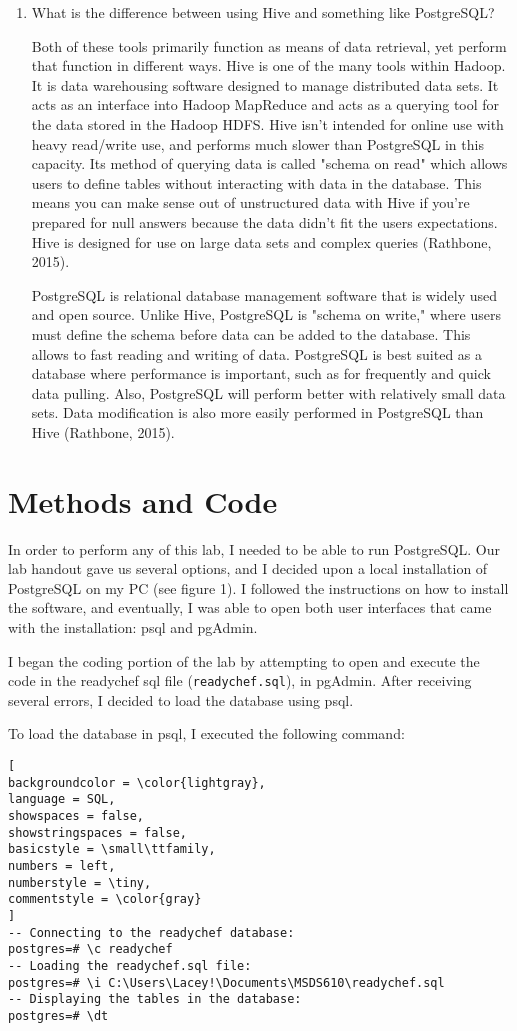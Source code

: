 \documentclass[]{article}
\newcommand{\code}[1]{\colorbox{light-gray}{\texttt{#1}}}
\begin{document}
\begin{enumerate}
\item What is the difference between using Hive and something like PostgreSQL?

Both of these tools primarily function as means of data retrieval, yet perform that function in different ways.  Hive is one of the many tools within Hadoop.  It is data warehousing software designed to manage distributed data sets.  It acts as an interface into Hadoop MapReduce and acts as a querying tool for the data stored in the Hadoop HDFS.  Hive isn't intended for online use with heavy read/write use, and performs much slower than PostgreSQL in this capacity.  Its method of querying data is called "schema on read" which allows users to define tables without interacting with data in the database.  This means you can make sense out of unstructured data with Hive if you're prepared for null answers because the data didn't fit the users expectations.  Hive is designed for use on large data sets and complex queries (Rathbone, 2015).  

PostgreSQL is relational database management software that is widely used and open source.  Unlike Hive, PostgreSQL is "schema on write," where users must define the schema before data can be added to the database.  This allows to fast reading and writing of data.  PostgreSQL is best suited as a database where performance is important, such as for frequently and quick data pulling.  Also, PostgreSQL will perform better with relatively small data sets.  Data modification is also more easily performed in PostgreSQL than Hive (Rathbone, 2015).

\end{enumerate}
\section{Methods and Code}
In order to perform any of this lab, I needed to be able to run PostgreSQL.  Our lab handout gave us several options, and I decided upon a local installation of PostgreSQL on my PC (see figure 1). I followed the instructions on how to install the software, and eventually, I was able to open both user interfaces that came with the installation: psql and pgAdmin.  

I began the coding portion of the lab by attempting to open and execute the code in the readychef sql file (\code{readychef.sql}), in pgAdmin.  After receiving several errors, I decided to load the database using psql.  

To load the database in psql, I executed the following command:
\begin{lstlisting}[
backgroundcolor = \color{lightgray},
language = SQL,
showspaces = false,
showstringspaces = false,
basicstyle = \small\ttfamily,
numbers = left,
numberstyle = \tiny,
commentstyle = \color{gray}
]
-- Connecting to the readychef database:
postgres=# \c readychef
-- Loading the readychef.sql file:
postgres=# \i C:\Users\Lacey!\Documents\MSDS610\readychef.sql
-- Displaying the tables in the database:
postgres=# \dt
\end{lstlisting}
\end{document}

